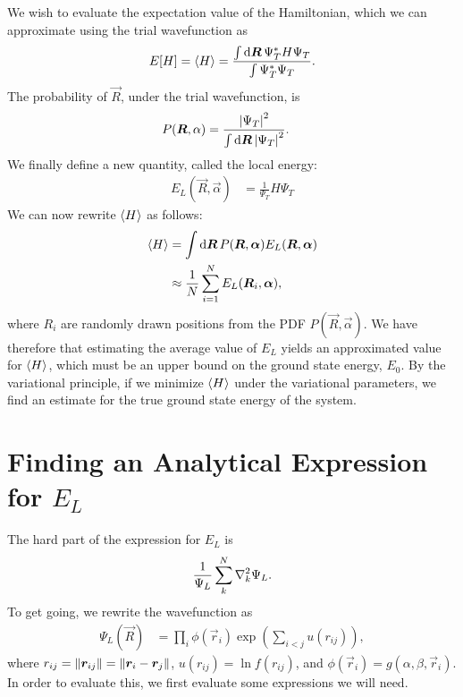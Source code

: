 \documentclass[]{article}
\begin{document}
We wish to evaluate the expectation value of the Hamiltonian, which we can approximate using the
trial wavefunction as
\begin{align}
    E[H] = \expval{H} = \frac{\int \dd{\bm R} \Psi^*_T H \Psi_T}{\int
    \Psi_T^*\Psi_T}.
\end{align}
The probability of $\vec R$, under the trial wavefunction, is
\begin{align}
    P(\bm R, \alpha) &= \frac{\abs{\Psi_T}^2}{\int \dd{\bm R}\abs{\Psi_T}^2}.
\end{align}
We finally define a new quantity, called the local energy:
\begin{align}
    E_L(\vec R, \vec \alpha) &= \frac{1}{\Psi_T}H\Psi_T\label{eq:E_L}
\end{align}
We can now rewrite $\expval{H}$ as follows:
\begin{align}
    \begin{split}
        \expval{H} &= \int \dd{\bm R} P(\bm R,\bm\alpha) E_L(\bm R,\bm\alpha)\\
    &\approx
    \frac{1}{N}\sum_{i=1}^N E_L(\bm R_i,\bm\alpha),
    \end{split}
\end{align}
where $R_i$ are randomly drawn positions from the PDF $P(\vec R, \vec\alpha)$.
We have therefore that estimating the average value of $E_L$ yields an
approximated value for $\expval{H}$, which must be an upper bound on the
ground state energy, $E_0$. By the variational principle, if we minimize
$\expval{H}$ under the variational parameters, we find an estimate for the true
ground state energy of the system.


\section{Finding an Analytical Expression for $E_L$}
The hard part of the expression for $E_L$ is
\begin{align}
    \frac{1}{\Psi_L}\sum_{k}^N\laplacian_k{\Psi_L}.
\end{align}
To get going, we rewrite the wavefunction as
\begin{align}
    \Psi_L(\vec R) &= \prod_i \phi(\vec r_i)\exp(\sum_{i<j}u(r_{ij})),
\end{align}
where $r_{ij} = \norm{\bm r_{ij}} = \norm{\bm r_i - \bm r_j}$, $u(r_{ij}) =
\ln f(r_{ij})$, and $\phi(\vec r_i)=g(\alpha,\beta,\vec r_i)$.
In order to evaluate this, we first evaluate some expressions we will need.
\end{document}
